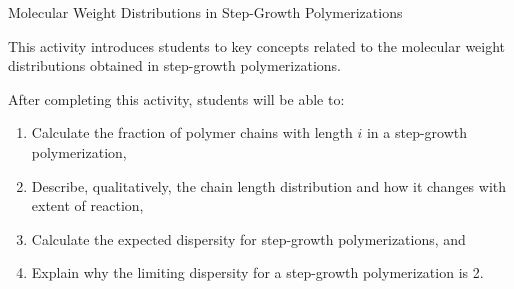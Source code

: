 %
%
%
%

\renewcommand{\figpath}{content/polymchem/stepgrowth/dispersity/figs}
\renewcommand{\labelbase}{step-dispersity}

\begin{activity}{Molecular Weight Distributions in Step-Growth Polymerizations}

\begin{instructornotes}

	This activity introduces students to key concepts related to the molecular weight distributions obtained in step-growth polymerizations.
	
	After completing this activity, students will be able to:
			\begin{enumerate}
				\item Calculate the fraction of polymer chains with length $i$ in a step-growth polymerization,
				\item Describe, qualitatively, the chain length distribution and how it changes with extent of reaction,
				\item Calculate the expected dispersity for step-growth polymerizations, and
				\item Explain why the limiting dispersity for a step-growth polymerization is 2.
			\end{enumerate}
			

\end{instructornotes}
\end{activity}
